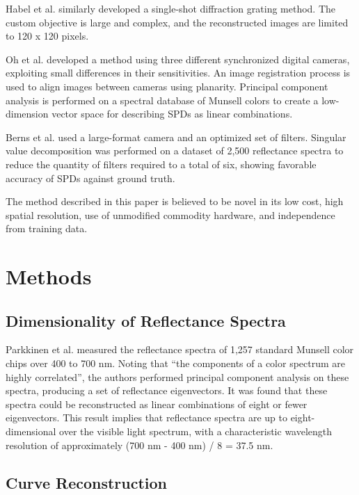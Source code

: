 \documentclass[twocolumn,10pt]{asme2ej}
\newcommand{\id}{\hspace{6 mm}}
\begin{document}
\id Habel et al. \cite{Habel} similarly developed a single-shot diffraction grating method. The custom objective is large and complex, and the reconstructed images are limited to 120 x 120 pixels.

\id Oh et al. \cite{Oh} developed a method using three different synchronized digital cameras, exploiting small differences in their sensitivities. An image registration process is used to align images between cameras using planarity. Principal component analysis is performed on a spectral database of Munsell colors to create a low-dimension vector space for describing SPDs as linear combinations.

\id Berns et al. \cite{Berns} used a large-format camera and an optimized set of filters. Singular value decomposition was performed on a dataset of 2,500 reflectance spectra to reduce the quantity of filters required to a total of six, showing favorable accuracy of SPDs against ground truth.

\id The method described in this paper is believed to be novel in its low cost, high spatial resolution, use of unmodified commodity hardware, and independence from training data.

\section{Methods}

\subsection{Dimensionality of Reflectance Spectra}

Parkkinen et al. \cite{Parkkinen} measured the reflectance spectra of 1,257 standard Munsell color chips over 400 to 700 nm. Noting that ``the components of a color spectrum are highly correlated'', the authors performed principal component analysis on these spectra, producing a set of reflectance eigenvectors. It was found that these spectra could be reconstructed as linear combinations of eight or fewer eigenvectors. This result implies that reflectance spectra are up to eight-dimensional over the visible light spectrum, with a characteristic wavelength resolution of approximately (700 nm - 400 nm) / 8 = 37.5 nm.

\subsection{Curve Reconstruction}
\label{curve_reconstruction}
\end{document}

